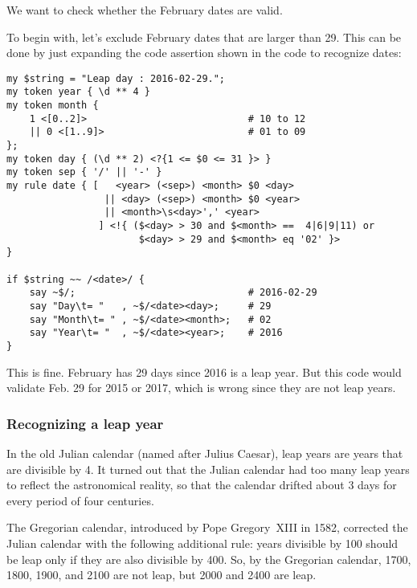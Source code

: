 We want to check whether the February dates are valid.

To begin with, let's exclude February dates that are 
larger than 29. This can be done by just expanding the 
code assertion shown in the code to recognize dates:

\begin{verbatim}
my $string = "Leap day : 2016-02-29.";                                         
my token year { \d ** 4 }                                        
my token month {   
    1 <[0..2]>                            # 10 to 12                     
    || 0 <[1..9]>                         # 01 to 09                     
};
my token day { (\d ** 2) <?{1 <= $0 <= 31 }> }  
my token sep { '/' || '-' }                                                 
my rule date { [   <year> (<sep>) <month> $0 <day> 
                 || <day> (<sep>) <month> $0 <year> 
                 || <month>\s<day>',' <year>
                ] <!{ ($<day> > 30 and $<month> ==  4|6|9|11) or 
                       $<day> > 29 and $<month> eq '02' }>
}                         

if $string ~~ /<date>/ {
    say ~$/;                              # 2016-02-29
    say "Day\t= "   , ~$/<date><day>;     # 29
    say "Month\t= " , ~$/<date><month>;   # 02
    say "Year\t= "  , ~$/<date><year>;    # 2016
}                    
\end{verbatim}

This is fine. February has 29 days since 2016 is a leap 
year. But this code would validate Feb. 29 for 2015 or 
2017, which is wrong since they are not leap years.

\subsubsection{Recognizing a leap year}

In the old Julian calendar (named after Julius Caesar), 
leap years are years that are divisible by 4. It turned 
out that the Julian calendar had too many leap years 
to reflect the astronomical reality, so that the 
calendar drifted about 3 days for every period of four 
centuries.

The Gregorian calendar, introduced by Pope Gregory~XIII 
in 1582, corrected the Julian calendar with 
the following additional rule: years divisible by 100 should 
be leap only if they are also divisible by 400. So, by the 
Gregorian calendar, 1700, 1800, 1900, and 2100 are not leap, 
but 2000 and 2400 are leap.

